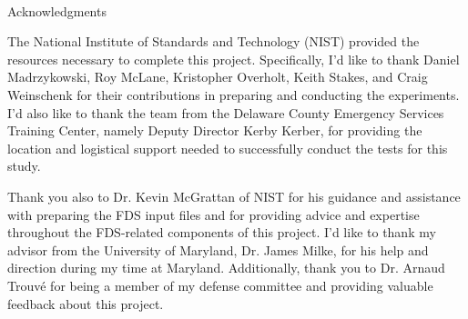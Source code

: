 
\renewcommand{\baselinestretch}{2}
\small\normalsize
\hbox{\ }
 
\vspace{-.65in}

\begin{center}
\large{Acknowledgments} 
\end{center} 

\vspace{1ex}

The National Institute of Standards and Technology (NIST) provided the resources necessary to complete this project. Specifically, I'd like to thank Daniel Madrzykowski, Roy McLane, Kristopher Overholt, Keith Stakes, and Craig Weinschenk for their contributions in preparing and conducting the experiments. I'd also like to thank the team from the Delaware County Emergency Services Training Center, namely Deputy Director Kerby Kerber, for providing the location and logistical support needed to successfully conduct the tests for this study.  

Thank you also to Dr. Kevin McGrattan of NIST for his guidance and assistance with preparing the FDS input files and for providing advice and expertise throughout the FDS-related components of this project. I'd like to thank my advisor from the University of Maryland, Dr. James Milke, for his help and direction during my time at Maryland. Additionally, thank you to Dr. Arnaud Trouv\'e for being a member of my defense committee and providing valuable feedback about this project. 